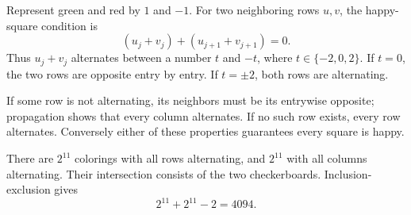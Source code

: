 Represent green and red by $1$ and $-1$. For two neighboring rows $u,v$, the happy-square condition is
\[
(u_j+v_j)+(u_{j+1}+v_{j+1})=0.
\]
Thus $u_j+v_j$ alternates between a number $t$ and $-t$, where $t\in\{-2,0,2\}$. If $t=0$, the two rows are opposite entry by entry. If $t=\pm2$, both rows are alternating.

If some row is not alternating, its neighbors must be its entrywise opposite; propagation shows that every column alternates. If no such row exists, every row alternates. Conversely either of these properties guarantees every square is happy.

There are $2^{11}$ colorings with all rows alternating, and $2^{11}$ with all columns alternating. Their intersection consists of the two checkerboards. Inclusion-exclusion gives
\[
\boxed{2^{11}+2^{11}-2=4094}.
\]

